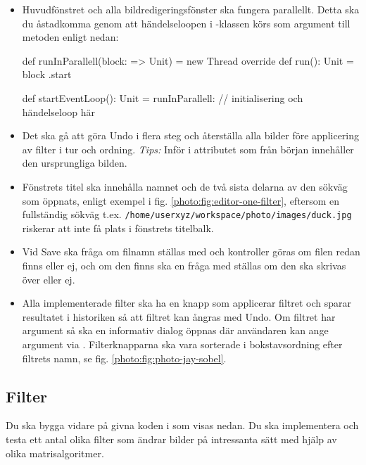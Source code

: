 \begin{itemize}
\item Huvudfönstret och alla bildredigeringsfönster ska fungera parallellt. Detta ska du åstadkomma genom att händelseloopen i -klassen körs som argument till metoden  enligt nedan: 
\begin{CodeSmall}
  def runInParallell(block: => Unit) = 
    new Thread{ override def run(): Unit = block }.start

  def startEventLoop(): Unit = runInParallell:
    // initialisering och händelseloop här
\end{CodeSmall}

\item Det ska gå att göra Undo i flera steg och återställa alla bilder före applicering av filter i tur och ordning. \emph{Tips:} Inför i attributet  som från början innehåller den ursprungliga bilden.

\item Fönstrets titel ska innehålla namnet  och de två sista delarna av den sökväg  som öppnats, enligt exempel i fig. \ref{photo:fig:editor-one-filter}, eftersom en fullständig sökväg t.ex. \texttt{/home/userxyz/workspace/photo/images/duck.jpg} riskerar att inte få plats i fönstrets titelbalk.

\item Vid Save ska fråga om filnamn ställas med  och kontroller göras om filen redan finns eller ej, och om den finns ska en fråga med  ställas om den ska skrivas över eller ej.

\item Alla implementerade filter ska ha en knapp som applicerar filtret och sparar resultatet i historiken så att filtret kan ångras med Undo. Om filtret har argument så ska en informativ dialog öppnas där användaren kan ange argument via . Filterknapparna ska vara sorterade i bokstavsordning efter filtrets namn, se fig. \ref{photo:fig:photo-jay-sobel}.
\end{itemize}




\subsection{Filter}

Du ska bygga vidare på givna koden i  som visas nedan. Du ska implementera och testa ett antal olika filter som ändrar bilder på intressanta sätt med hjälp av olika matrisalgoritmer.


